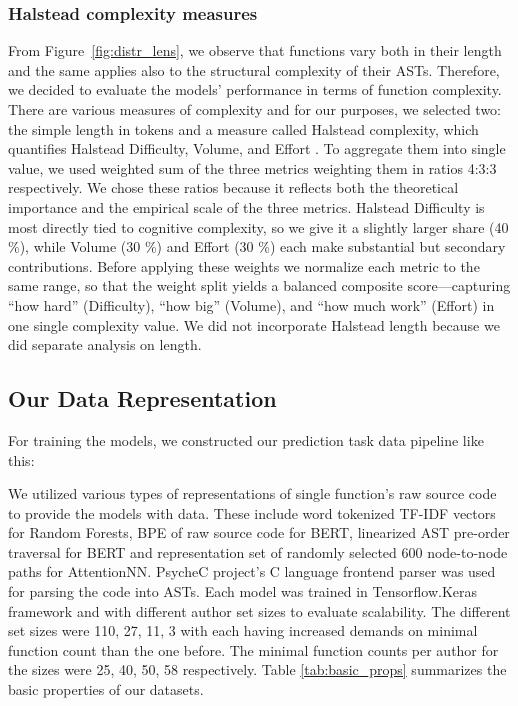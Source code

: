\documentclass[conference]{IEEEtran}
\begin{document}
\subsubsection{Halstead complexity measures}

From Figure~\ref{fig:distr_lens}, we observe that functions 
vary both in their length and the same applies also to the structural complexity of their ASTs. 
Therefore, we decided to evaluate the models' performance in terms of function 
complexity. There are various measures of complexity and for our purposes, 
we selected two: the simple length in tokens and a measure called Halstead 
complexity, which quantifies Halstead Difficulty, Volume, and Effort \citet{halstead}. 
To aggregate them into single value, we used weighted sum of the three metrics 
weighting them in ratios 4:3:3 respectively. We chose these ratios because it reflects both the theoretical importance 
and the empirical scale of the three metrics. Halstead Difficulty is most directly 
tied to cognitive complexity, so we give it a slightly larger share (40 \%), 
while Volume (30 \%) and Effort (30 \%) each make substantial but secondary 
contributions. Before applying these weights we normalize each metric 
to the same range, so that the weight split yields a balanced 
composite score—capturing “how hard” (Difficulty), “how big” (Volume), 
and “how much work” (Effort) in one single complexity value. We did not 
incorporate Halstead length because we did separate analysis on length.

\subsection{Our Data Representation}
For training the models, we constructed our prediction task data pipeline like this:

We utilized various 
types of representations of single function's raw source code to provide the models with data.
These include word tokenized TF-IDF vectors for Random Forests, BPE of raw source code for
BERT, linearized AST pre-order traversal for BERT and representation set of randomly selected 600 node-to-node paths for AttentionNN.  
PsycheC project's C language frontend parser \citet{psychec} was used for parsing the code into ASTs. Each model was trained in Tensorflow.Keras framework and with different author set sizes to evaluate scalability. The different set sizes were
110, 27, 11, 3 with each having increased demands on minimal function count than the one before. The minimal function counts per author for the sizes were 25, 40, 50, 58 respectively.
Table \ref{tab:basic_props} summarizes the basic properties of our datasets.
\end{document}
